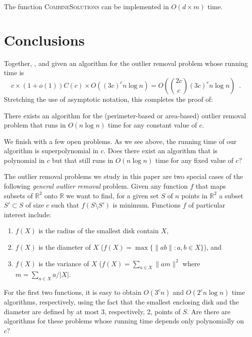 \documentclass[lotsofwhite]{patmorin}
\newcommand{\runtime}{{2c\choose c}(3c)^c n\log n}
\begin{document}
\begin{lem}
The function \textsc{CombineSolutions} can be implemented in
$O(d\times m)$ time.
\end{lem}


\section{Conclusions}

Together, ,  and 
given an algorithm for the outlier removal problem whose running time
is
\[
    c \times (1+o(1))C(c) \times O((3c)^cn\log n) =
O\left(\runtime\right)\enspace .
\]
Stretching the use of asymptotic notation, this completes the proof of:
\begin{thm}
There exists an algorithm for the (perimeter-based or area-based)
outlier removal problem that runs in $O(n\log n)$ time for any
constant value of $c$.
\end{thm}

We finish with a few open problems.  As we see above, the running time
of our algorithm is superpolynomial in $c$. Does there exist an
algorithm that is polynomial in $c$ but that still runs in $O(n\log
n)$ time for any fixed value of $c$?

The outlier removal problems we study in this paper are two special
cases of the following \emph{general outlier removal} problem.  Given
any function $f$ that maps subsets of $\mathbb{R}^2$ onto $\mathbb{R}$
we want to find, for a given set $S$ of $n$ points in $\mathbb{R}^2$ a
subset $S'\subset S$ of size $c$ such that $f(S\setminus S')$ is
minimum.  Functions $f$ of particular interest include:
\begin{enumerate}
\item $f(X)$ is the radius of the smallest disk contain $X$,
\item $f(X)$ is the diameter of $X$ ($f(X)=\max\{\|ab\|:a,b\in X\}$), and
\item $f(X)$ is the variance of $X$ ($f(X)=\sum_{a\in X} \| am \|^2$
where $m=\sum_{a\in X} a/|X|$.
\end{enumerate}
For the first two functions, it is easy to obtain $O(3^c n)$ and
$O(2^cn\log n)$ time algorithms, respectively, using the fact that the
smallest enclosing disk and the diameter are defined by at most 3,
respectively, 2, points of $S$.  Are there are algorithms for these
problems whose running time depends only polynomially on $c$?



\end{document}
